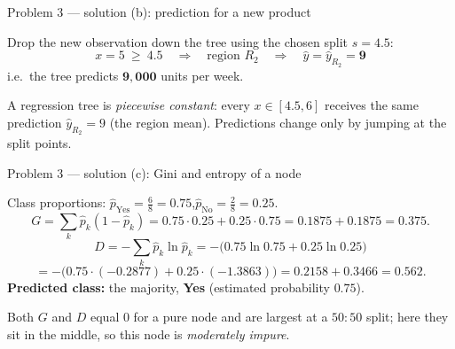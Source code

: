\documentclass[aspectratio=169,11pt]{beamer}
\begin{document}
\begin{frame}{Problem 3 --- solution (b): prediction for a new product}
  \begin{solutionbox}
    Drop the new observation down the tree using the chosen split $s=4.5$:
    \[
      x=5\ \ge\ 4.5 \quad\Longrightarrow\quad \text{region } R_2
      \quad\Longrightarrow\quad \hat y=\hat y_{R_2}=\mathbf{9}
    \]
    i.e.\ the tree predicts $\mathbf{9{,}000}$ units per week.
  \end{solutionbox}
  \begin{takeaway}
    \footnotesize A regression tree is \emph{piecewise constant}: every $x\in[4.5,6]$ receives the
    same prediction $\hat y_{R_2}=9$ (the region mean). Predictions change only by jumping at the
    split points.
  \end{takeaway}
\end{frame}

\begin{frame}{Problem 3 --- solution (c): Gini and entropy of a node}
  \begin{solutionbox}
    Class proportions: $\hat p_{\text{Yes}}=\tfrac{6}{8}=0.75$,\quad $\hat p_{\text{No}}=\tfrac{2}{8}=0.25$.
    \[
      G=\sum_k \hat p_k(1-\hat p_k)=0.75\cdot0.25+0.25\cdot0.75=0.1875+0.1875=\mathbf{0.375}.
    \]
    \[
      D=-\sum_k \hat p_k\ln\hat p_k=-\bigl(0.75\ln0.75+0.25\ln0.25\bigr)
    \]
    \[
      =-\bigl(0.75\cdot(-0.2877)+0.25\cdot(-1.3863)\bigr)=0.2158+0.3466=\mathbf{0.562}.
    \]
    \textbf{Predicted class:} the majority, \textbf{Yes} (estimated probability $0.75$).
  \end{solutionbox}
  \begin{takeaway}
    \footnotesize Both $G$ and $D$ equal $0$ for a pure node and are largest at a $50\!:\!50$ split;
    here they sit in the middle, so this node is \emph{moderately impure}.
  \end{takeaway}
\end{frame}
\end{document}
